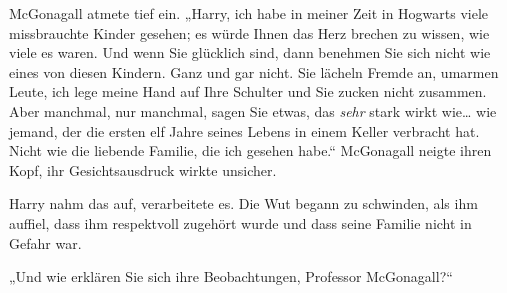 McGonagall atmete tief ein. „Harry, ich habe in meiner Zeit in Hogwarts viele missbrauchte Kinder gesehen; es würde Ihnen das Herz brechen zu wissen, wie viele es waren. Und wenn Sie glücklich sind, dann benehmen Sie sich nicht wie eines von diesen Kindern. Ganz und gar nicht. Sie lächeln Fremde an, umarmen Leute, ich lege meine Hand auf Ihre Schulter und Sie zucken nicht zusammen. Aber manchmal, nur manchmal, sagen Sie etwas, das \emph{sehr} stark wirkt wie… wie jemand, der die ersten elf Jahre seines Lebens in einem Keller verbracht hat. Nicht wie die liebende Familie, die ich gesehen habe.“ McGonagall neigte ihren Kopf, ihr Gesichtsausdruck wirkte unsicher.

Harry nahm das auf, verarbeitete es. Die Wut begann zu schwinden, als ihm auffiel, dass ihm respektvoll zugehört wurde und dass seine Familie nicht in Gefahr war.

„Und wie erklären Sie sich ihre Beobachtungen, Professor McGonagall?“

